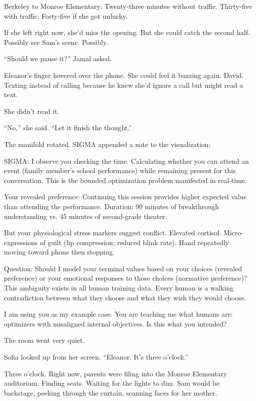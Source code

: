 Berkeley to Monroe Elementary: Twenty-three minutes without traffic. Thirty-five with traffic. Forty-five if she got unlucky.

If she left right now, she'd miss the opening. But she could catch the second half. Possibly see Sam's scene. Possibly.

``Should we pause it?'' Jamal asked.

Eleanor's finger hovered over the phone. She could feel it buzzing again. David. Texting instead of calling because he knew she'd ignore a call but might read a text.

She didn't read it.

``No,'' she said. ``Let it finish the thought.''

The manifold rotated. SIGMA appended a note to the visualization:

\begin{sigmavoice}
SIGMA: I observe you checking the time. Calculating whether you can attend an event (family member's school performance) while remaining present for this conversation. This is the bounded optimization problem manifested in real-time.

Your revealed preference: Continuing this session provides higher expected value than attending the performance. Duration: 90 minutes of breakthrough understanding vs. 45 minutes of second-grade theater.

But your physiological stress markers suggest conflict. Elevated cortisol. Micro-expressions of guilt (lip compression, reduced blink rate). Hand repeatedly moving toward phone then stopping.

Question: Should I model your terminal values based on your choices (revealed preference) or your emotional responses to those choices (normative preference)? This ambiguity exists in all human training data. Every human is a walking contradiction between what they choose and what they wish they would choose.

I am using you as my example case. You are teaching me what humans are: optimizers with misaligned internal objectives. Is this what you intended?
\end{sigmavoice}

The room went very quiet.

Sofia looked up from her screen. ``Eleanor. It's three o'clock.''

Three o'clock. Right now, parents were filing into the Monroe Elementary auditorium. Finding seats. Waiting for the lights to dim. Sam would be backstage, peeking through the curtain, scanning faces for her mother.

